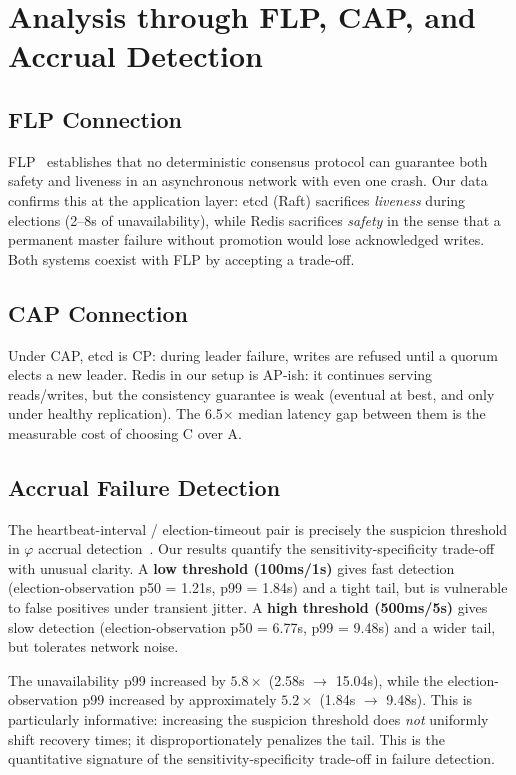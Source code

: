 \documentclass[conference]{IEEEtran}
\begin{document}
\section{Analysis through FLP, CAP, and Accrual Detection}

\subsection{FLP Connection}
FLP~\cite{fischer1985impossibility} establishes that no deterministic consensus protocol can guarantee both safety and liveness in an asynchronous network with even one crash. Our data confirms this at the application layer: etcd (Raft) sacrifices \textit{liveness} during elections (2--8s of unavailability), while Redis sacrifices \textit{safety} in the sense that a permanent master failure without promotion would lose acknowledged writes. Both systems coexist with FLP by accepting a trade-off.

\subsection{CAP Connection}
Under CAP, etcd is CP: during leader failure, writes are refused until a quorum elects a new leader. Redis in our setup is AP-ish: it continues serving reads/writes, but the consistency guarantee is weak (eventual at best, and only under healthy replication). The 6.5$\times$ median latency gap between them is the measurable cost of choosing C over A.

\subsection{Accrual Failure Detection}
The heartbeat-interval / election-timeout pair is precisely the suspicion threshold in $\varphi$ accrual detection~\cite{hayashibara2004phi}. Our results quantify the sensitivity-specificity trade-off with unusual clarity. A \textbf{low threshold (100ms/1s)} gives fast detection (election-observation p50 = 1.21s, p99 = 1.84s) and a tight tail, but is vulnerable to false positives under transient jitter. A \textbf{high threshold (500ms/5s)} gives slow detection (election-observation p50 = 6.77s, p99 = 9.48s) and a wider tail, but tolerates network noise.

The unavailability p99 increased by $5.8\times$ (2.58s $\rightarrow$ 15.04s), while the election-observation p99 increased by approximately $5.2\times$ (1.84s $\rightarrow$ 9.48s). This is particularly informative: increasing the suspicion threshold does \textit{not} uniformly shift recovery times; it disproportionately penalizes the tail. This is the quantitative signature of the sensitivity-specificity trade-off in failure detection.
\end{document}
